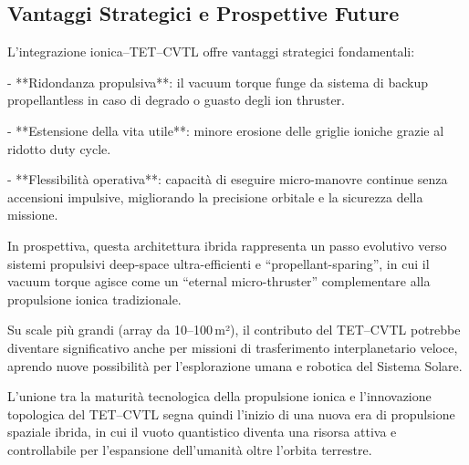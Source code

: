 \documentclass[11pt,a4paper]{article}
\theoremstyle{plain}
\theoremstyle{definition}
\begin{document}
\vspace{0.4cm}


\subsection{Vantaggi Strategici e Prospettive Future}

\vspace{0.2cm}

L’integrazione ionica–TET--CVTL offre vantaggi strategici fondamentali:

\vspace{0.4cm}
- **Ridondanza propulsiva**: il vacuum torque funge da sistema di backup propellantless in caso di degrado o guasto degli ion thruster.

\vspace{0.2cm}
- **Estensione della vita utile**: minore erosione delle griglie ioniche grazie al ridotto duty cycle.

\vspace{0.2cm}
- **Flessibilità operativa**: capacità di eseguire micro-manovre continue senza accensioni impulsive, migliorando la precisione orbitale e la sicurezza della missione.

\vspace{0.3cm}

In prospettiva, questa architettura ibrida rappresenta un passo evolutivo verso sistemi propulsivi deep-space ultra-efficienti e “propellant-sparing”, in cui il vacuum torque agisce come un “eternal micro-thruster” complementare alla propulsione ionica tradizionale. 


\vspace{0.4cm}

Su scale più grandi (array da 10–100\,m²), il contributo del TET--CVTL potrebbe diventare significativo anche per missioni di trasferimento interplanetario veloce, aprendo nuove possibilità per l’esplorazione umana e robotica del Sistema Solare.

\vspace{0.3cm}

L’unione tra la maturità tecnologica della propulsione ionica e l’innovazione topologica del TET--CVTL segna quindi l’inizio di una nuova era di propulsione spaziale ibrida, in cui il vuoto quantistico diventa una risorsa attiva e controllabile per l’espansione dell’umanità oltre l’orbita terrestre.



\vspace{0.6cm}
\end{document}
